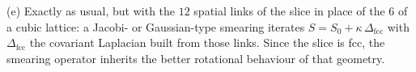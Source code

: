 {(e) Exactly as usual, but with the $12$ spatial links of the slice in place of
the $6$ of a cubic lattice: a Jacobi- or Gaussian-type smearing iterates
$S = S_0 + \kappa\,\Delta_{\text{fcc}}$ with $\Delta_{\text{fcc}}$ the covariant
Laplacian built from those links. Since the slice is fcc, the smearing operator
inherits the better rotational behaviour of that geometry.}
